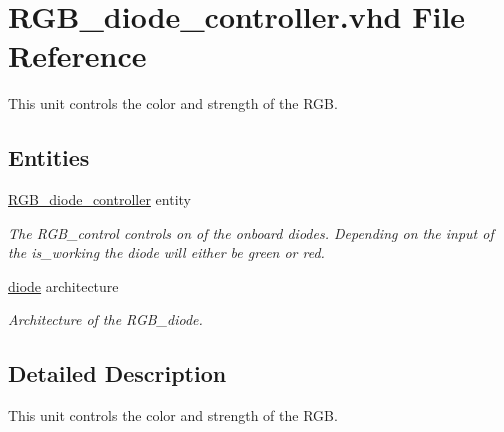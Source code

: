 \hypertarget{RGB__diode__controller_8vhd}{\section{R\-G\-B\-\_\-diode\-\_\-controller.\-vhd File Reference}
\label{RGB__diode__controller_8vhd}
}


This unit controls the color and strength of the R\-G\-B.  


\subsection*{Entities}
\begin{DoxyCompactItemize}
\item 
\hyperlink{classRGB__diode__controller}{R\-G\-B\-\_\-diode\-\_\-controller} entity
\begin{DoxyCompactList}\small\item\em The R\-G\-B\-\_\-control controls on of the onboard diodes. Depending on the input of the is\-\_\-working the diode will either be green or red. \end{DoxyCompactList}\item 
\hyperlink{classRGB__diode__controller_1_1diode}{diode} architecture
\begin{DoxyCompactList}\small\item\em Architecture of the R\-G\-B\-\_\-diode. \end{DoxyCompactList}\end{DoxyCompactItemize}


\subsection{Detailed Description}
This unit controls the color and strength of the R\-G\-B. 